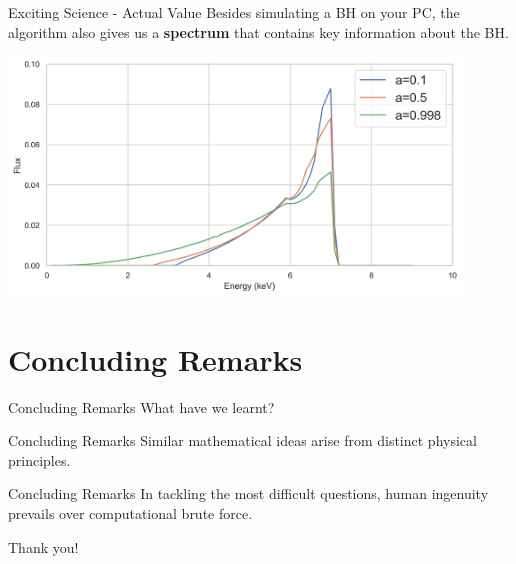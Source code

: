 \documentclass{beamer}
\begin{document}
\begin{frame}{Exciting Science - Actual Value}
    Besides simulating a BH on your PC, the algorithm also gives us a \textbf{spectrum} that contains key information about the BH.

    \vspace{0.5cm}

    \centering
    \includegraphics[width=0.90\textwidth]{asset/spectrum.png}
\end{frame}


\section{Concluding Remarks}


\begin{frame}{Concluding Remarks}
    \Large
    What have we learnt?
\end{frame}


\begin{frame}{Concluding Remarks}
    \Large
    Similar mathematical ideas arise from distinct physical principles.
\end{frame}


\begin{frame}{Concluding Remarks}
    \Large
    In tackling the most difficult questions, human ingenuity prevails over computational brute force.
\end{frame}


\begin{frame}{}
    \begin{center}
        {\Huge Thank you!}
    \end{center}
\end{frame}
\end{document}
